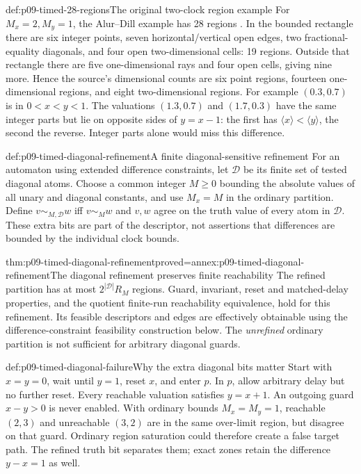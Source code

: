 \begin{hbexample}{def:p09-timed-28-regions}{The original two-clock region example}
For \(M_x=2,M_y=1\), the Alur--Dill example has 28 regions
\cite[ex.~4.4, fig.~9]{AlurDill1994TimedOriginal}. In the bounded rectangle
there are six integer points, seven horizontal/vertical open edges, two
fractional-equality diagonals, and four open two-dimensional cells: 19
regions. Outside that rectangle there are five one-dimensional rays and
four open cells, giving nine more. Hence the source's dimensional counts
are six point regions, fourteen one-dimensional regions, and eight
two-dimensional regions. For example \((0.3,0.7)\) is in \(0<x<y<1\).
The valuations \((1.3,0.7)\) and \((1.7,0.3)\) have the same integer
parts but lie on opposite sides of \(y=x-1\): the first has
\(\langle x\rangle<\langle y\rangle\), the second the reverse.
Integer parts alone would miss this difference.
\end{hbexample}

\begin{hbdefinition}{def:p09-timed-diagonal-refinement}{A finite diagonal-sensitive refinement}
For an automaton using extended difference constraints, let \(\mathcal D\)
be its finite set of tested diagonal atoms. Choose a common integer
\(M\geq0\) bounding the absolute values of all unary and diagonal
constants, and use \(M_x=M\) in the ordinary partition. Define
\(v\sim_{M,\mathcal D}w\) iff \(v\sim_Mw\) and \(v,w\) agree on
the truth value of every atom in \(\mathcal D\). These extra bits are
part of the descriptor, not assertions that differences are bounded by
the individual clock bounds.
\end{hbdefinition}

\begin{hbtheorem}{thm:p09-timed-diagonal-refinement}{proved=annex:p09-timed-diagonal-refinement}{The diagonal refinement preserves finite reachability}
The refined partition has at most \(2^{|\mathcal D|}R_M\) regions. Guard,
invariant, reset and matched-delay properties, and the quotient finite-run
reachability equivalence, hold for this refinement. Its feasible descriptors
and edges are effectively obtainable using the difference-constraint
feasibility construction below. The \emph{unrefined} ordinary partition is
not sufficient for arbitrary diagonal guards.
\end{hbtheorem}

\begin{hbexample}{def:p09-timed-diagonal-failure}{Why the extra diagonal bits matter}
Start with \(x=y=0\), wait until \(y=1\), reset \(x\), and enter \(p\).
In \(p\), allow arbitrary delay but no further reset. Every reachable
valuation satisfies \(y=x+1\). An outgoing guard \(x-y>0\) is never
enabled. With ordinary bounds \(M_x=M_y=1\), reachable \((2,3)\) and
unreachable \((3,2)\) are in the same over-limit region, but disagree on
that guard. Ordinary region saturation could therefore create a false
target path. The refined truth bit separates them; exact zones retain the
difference \(y-x=1\) as well.
\end{hbexample}

